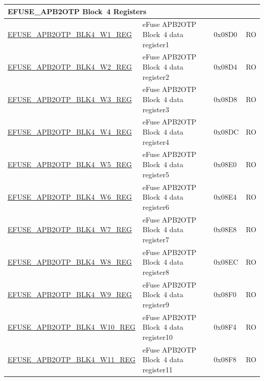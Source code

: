 \begin{longtable}{ | p{7cm} | p{6cm} | p{1.2cm} | p{1.5cm} | }
\multicolumn{4}{|l|}{\textbf{EFUSE\_APB2OTP Block~4 Registers}} \\ \hline
\hyperref[regdesc:EFUSEAPB2OTPBLK4WNREG]{EFUSE\_APB2OTP\_BLK4\_W1\_REG} & eFuse APB2OTP Block~4 data register1 & 0x08D0 & RO \\\hline
\hyperref[regdesc:EFUSEAPB2OTPBLK4WNREG]{EFUSE\_APB2OTP\_BLK4\_W2\_REG} & eFuse APB2OTP Block~4 data register2 & 0x08D4 & RO \\\hline
\hyperref[regdesc:EFUSEAPB2OTPBLK4WNREG]{EFUSE\_APB2OTP\_BLK4\_W3\_REG} & eFuse APB2OTP Block~4 data register3 & 0x08D8 & RO \\\hline
\hyperref[regdesc:EFUSEAPB2OTPBLK4WNREG]{EFUSE\_APB2OTP\_BLK4\_W4\_REG} & eFuse APB2OTP Block~4 data register4 & 0x08DC & RO \\\hline
\hyperref[regdesc:EFUSEAPB2OTPBLK4WNREG]{EFUSE\_APB2OTP\_BLK4\_W5\_REG} & eFuse APB2OTP Block~4 data register5 & 0x08E0 & RO \\\hline
\hyperref[regdesc:EFUSEAPB2OTPBLK4WNREG]{EFUSE\_APB2OTP\_BLK4\_W6\_REG} & eFuse APB2OTP Block~4 data register6 & 0x08E4 & RO \\\hline
\hyperref[regdesc:EFUSEAPB2OTPBLK4WNREG]{EFUSE\_APB2OTP\_BLK4\_W7\_REG} & eFuse APB2OTP Block~4 data register7 & 0x08E8 & RO \\\hline
\hyperref[regdesc:EFUSEAPB2OTPBLK4WNREG]{EFUSE\_APB2OTP\_BLK4\_W8\_REG} & eFuse APB2OTP Block~4 data register8 & 0x08EC & RO \\\hline
\hyperref[regdesc:EFUSEAPB2OTPBLK4WNREG]{EFUSE\_APB2OTP\_BLK4\_W9\_REG} & eFuse APB2OTP Block~4 data register9 & 0x08F0 & RO \\\hline
\hyperref[regdesc:EFUSEAPB2OTPBLK4WNREG]{EFUSE\_APB2OTP\_BLK4\_W10\_REG} & eFuse APB2OTP Block~4 data register10 & 0x08F4 & RO \\\hline
\hyperref[regdesc:EFUSEAPB2OTPBLK4WNREG]{EFUSE\_APB2OTP\_BLK4\_W11\_REG} & eFuse APB2OTP Block~4 data register11 & 0x08F8 & RO \\\hline


\end{longtable}
